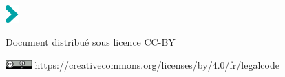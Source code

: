 \hspace{-1cm}
\setlength{\parindent}{0cm}
\includegraphics[width=0.5cm]{templates/fleche-titre}\hspace{0.3cm}\textcolor{inrae}{\sffamily\Huge\bfseries \inserttitle}\par\bigskip

\hspace{-1cm}\textcolor{inrae}{\sffamily \insertdate}\par

\vspace*{1cm}

\hspace{-1cm}\textcolor{inraefonce}{\sffamily \insertauthor}\par

\hspace{-1cm}\textcolor{inraefonce}{\sffamily
Document distribué sous licence CC-BY}\par

\hspace{-1cm}\includegraphics[width=1cm]{templates/cc-by} \href{https://creativecommons.org/licenses/by/4.0/fr/legalcode}{https://creativecommons.org/licenses/by/4.0/fr/legalcode}

\restoregeometry


